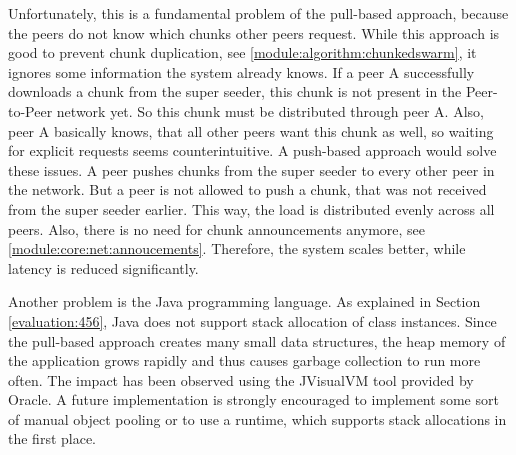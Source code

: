 Unfortunately, this is a fundamental problem of the pull-based approach, because the peers do not know which chunks other peers request. While this approach is good to prevent chunk duplication, see \ref{module:algorithm:chunkedswarm}, it ignores some information the system already knows. If a peer A successfully downloads a chunk from the super seeder, this chunk is not present in the Peer-to-Peer network yet. So this chunk must be distributed through peer A. Also, peer A basically knows, that all other peers want this chunk as well, so waiting for explicit requests seems counterintuitive. A push-based approach would solve these issues. A peer pushes chunks from the super seeder to every other peer in the network. But a peer is not allowed to push a chunk, that was not received from the super seeder earlier. This way, the load is distributed evenly across all peers. Also, there is no need for chunk announcements anymore, see \ref{module:core:net:annoucements}. Therefore, the system scales better, while latency is reduced significantly.

Another problem is the Java programming language. As explained in Section \ref{evaluation:456}, Java does not support stack allocation of class instances. Since the pull-based approach creates many small data structures, the heap memory of the application grows rapidly and thus causes garbage collection to run more often. The impact has been observed using the JVisualVM \cite{Misc:JVirtualVM} tool provided by Oracle. A future implementation is strongly encouraged to implement some sort of manual object pooling or to use a runtime, which supports stack allocations in the first place.